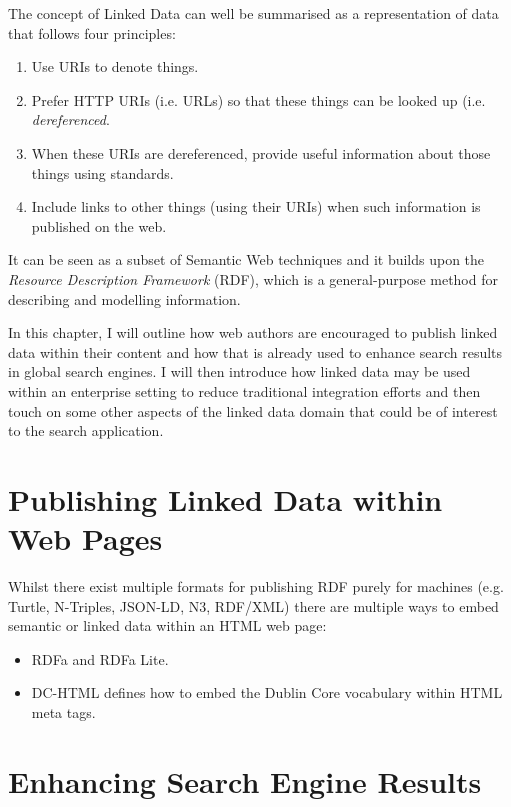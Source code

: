 \documentclass[10pt,a4paper]{report}
\begin{document}
The concept of Linked Data can well be summarised as a representation of
data that follows four principles:\cite{berners2011linked}

\begin{enumerate}
  \item Use URIs to denote things.
  \item Prefer HTTP URIs (i.e. URLs) so that these things can be looked
    up (i.e. \emph{dereferenced}.
  \item When these URIs are dereferenced, provide useful information about
    those things using standards.
  \item Include links to other things (using their URIs) when such
    information is published on the web.
\end{enumerate}

It can be seen as a subset of Semantic Web techniques and it builds upon
the \emph{Resource Description Framework} (RDF)\cite{lassila1999resource},
which is a general-purpose method for describing and modelling information.

In this chapter, I will outline how web authors are encouraged to publish
linked data within their content and how that is already used to enhance
search results in global search engines. I will then introduce how linked
data may be used within an enterprise setting to reduce traditional
integration efforts and then touch on some other aspects of the linked
data domain that could be of interest to the search application.

\section{Publishing Linked Data within Web Pages}

Whilst there exist multiple formats for publishing RDF purely for machines
(e.g. Turtle\cite{world2014rdf}, N-Triples, JSON-LD\cite{world2014json},
N3, RDF/XML) there are multiple ways to embed semantic or linked data within
an HTML web page:

\begin{itemize}
  \item RDFa\cite{adida2012rdfa} and RDFa Lite\cite{lite2004rdfa}.
  \item DC-HTML defines how to embed the Dublin Core vocabulary within HTML
    meta tags.
\end{itemize}

\section{Enhancing Search Engine Results}
\end{document}
